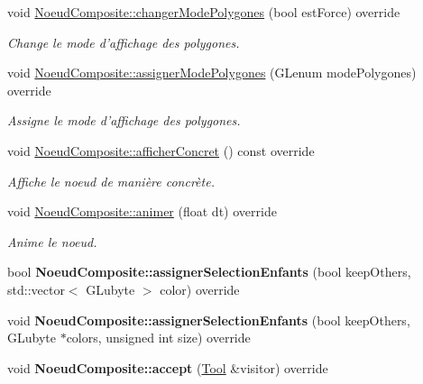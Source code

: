 \begin{DoxyCompactItemize}
void \hyperlink{group__inf2990_ga90bb01067866438b80d081967c133b81}{Noeud\-Composite\-::changer\-Mode\-Polygones} (bool est\-Force) override
\begin{DoxyCompactList}\small\item\em Change le mode d'affichage des polygones. \end{DoxyCompactList}\item 
void \hyperlink{group__inf2990_ga5caf8a3f9e06915463abdff7a473d95f}{Noeud\-Composite\-::assigner\-Mode\-Polygones} (G\-Lenum mode\-Polygones) override
\begin{DoxyCompactList}\small\item\em Assigne le mode d'affichage des polygones. \end{DoxyCompactList}\item 
void \hyperlink{group__inf2990_ga023450b00e424ff3600a93a6c844b4ad}{Noeud\-Composite\-::afficher\-Concret} () const override
\begin{DoxyCompactList}\small\item\em Affiche le noeud de manière concrète. \end{DoxyCompactList}\item 
void \hyperlink{group__inf2990_gac641c70147959a57b698854e016ff929}{Noeud\-Composite\-::animer} (float dt) override
\begin{DoxyCompactList}\small\item\em Anime le noeud. \end{DoxyCompactList}\item 
\hypertarget{group__inf2990_ga021e45b8fc867b1ccad256c0eb5f9ec7}{bool {\bfseries Noeud\-Composite\-::assigner\-Selection\-Enfants} (bool keep\-Others, std\-::vector$<$ G\-Lubyte $>$ color) override}\label{group__inf2990_ga021e45b8fc867b1ccad256c0eb5f9ec7}

\item 
\hypertarget{group__inf2990_gac08da538d114a6afbb5f2b4a900a6e54}{void {\bfseries Noeud\-Composite\-::assigner\-Selection\-Enfants} (bool keep\-Others, G\-Lubyte $\ast$colors, unsigned int size) override}\label{group__inf2990_gac08da538d114a6afbb5f2b4a900a6e54}

\item 
\hypertarget{group__inf2990_ga0b60c180726f3a0501f42bc70bc0c52e}{void {\bfseries Noeud\-Composite\-::accept} (\hyperlink{class_tool}{Tool} \&visitor) override}\label{group__inf2990_ga0b60c180726f3a0501f42bc70bc0c52e}


\end{DoxyCompactItemize}
